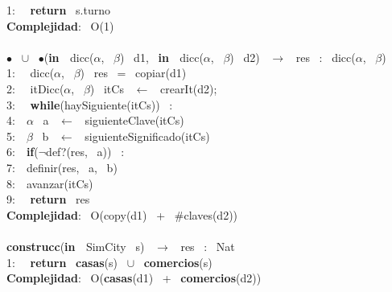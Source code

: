 \begin{Algoritmos}
1: \  \ \textbf{return} \ s.turno\\
\textbf{Complejidad}: \ O(1)\\
\makebox[\linewidth]{\rule{\textwidth}{0.4pt}}
\\
\makebox[\linewidth]{\rule{\textwidth}{0.4pt}}
$\bullet$ \ $\cup$ \ $\bullet$(\textbf{in \ }dicc($\alpha$, \ $\beta$) \ d1, \ \textbf{in \ }dicc($\alpha$, \ $\beta$) \ d2) \ $\rightarrow $ \ res \ : \ dicc($\alpha$, \ $\beta$)\\
1: \  \ dicc($\alpha$, \ $\beta$) \ res \ = \ copiar(d1)\\
2: \  \ itDicc($\alpha$, \ $\beta$) \ itCs \ $\leftarrow$ \ crearIt(d2);\\
3: \  \ \textbf{while}(haySiguiente(itCs)) \ :\\
4:\indent  \  \ $\alpha$ \ a \ $\leftarrow$ \ siguienteClave(itCs)\\
5:\indent  \  \ $\beta$ \ b \ $\leftarrow$ \ siguienteSignificado(itCs)\\
6:\indent  \  \ \textbf{if}($\neg$def?(res, \ a)) \ :\\
7:\indent \indent  \  \ definir(res, \ a, \ b)\\
8:\indent  \  \ avanzar(itCs)\\
9: \  \ \textbf{return} \ res\\
\textbf{Complejidad}: \ O(copy(d1) \ + \ $ \# $claves(d2))\\
\makebox[\linewidth]{\rule{\textwidth}{0.4pt}}
\\
\makebox[\linewidth]{\rule{\textwidth}{0.4pt}}
\textbf{construcc}(\textbf{in \ }SimCity \ s) \ $\rightarrow $ \ res \ : \ Nat\\
1: \  \ \textbf{return} \ \textbf{casas}(s) \ $\cup$ \ \textbf{comercios}(s)\\
\textbf{Complejidad}: \ O(\textbf{casas}(d1) \ + \ \textbf{comercios}(d2))\\
\makebox[\linewidth]{\rule{\textwidth}{0.4pt}}\\
\end{Algoritmos}

